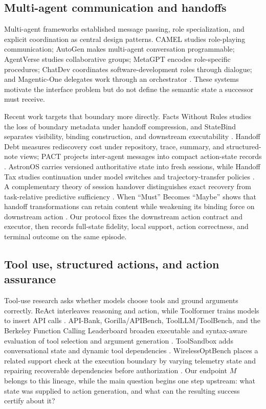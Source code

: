 \documentclass[11pt]{article}
\newcommand{\Maction}{M}
\begin{document}
\subsection{Multi-agent communication and handoffs}

Multi-agent frameworks established message passing, role specialization, and explicit coordination as central design patterns. CAMEL studies role-playing communication; AutoGen makes multi-agent conversation programmable; AgentVerse studies collaborative groups; MetaGPT encodes role-specific procedures; ChatDev coordinates software-development roles through dialogue; and Magentic-One delegates work through an orchestrator \citep{li2023camel,wu2024autogen,chen2024agentverse,hong2024metagpt,qian2024chatdev,fourney2024magenticone}. These systems motivate the interface problem but do not define the semantic state a successor must receive.

Recent work targets that boundary more directly. Facts Without Rules studies the loss of boundary metadata under handoff compression, and StateBind separates visibility, binding construction, and downstream executability \citep{wang2026facts,fu2026statebind}. Handoff Debt measures rediscovery cost under repository, trace, summary, and structured-note views; PACT projects inter-agent messages into compact action-state records \citep{kc2026handoffdebt,huang2026pact}. AstronOS carries versioned authoritative state into fresh sessions, while Handoff Tax studies continuation under model switches and trajectory-transfer policies \citep{nie2026astronos,ganz2026handofftax}. A complementary theory of session handover distinguishes exact recovery from task-relative predictive sufficiency \citep{kato2026handover}. When ``Must'' Becomes ``Maybe'' shows that handoff transformations can retain content while weakening its binding force on downstream action \citep{sun2026mustmaybe}. Our protocol fixes the downstream action contract and executor, then records full-state fidelity, local support, action correctness, and terminal outcome on the same episode.

\subsection{Tool use, structured actions, and action assurance}

Tool-use research asks whether models choose tools and ground arguments correctly. ReAct interleaves reasoning and action, while Toolformer trains models to insert API calls \citep{yao2023react,schick2023toolformer}. API-Bank, Gorilla/APIBench, ToolLLM/ToolBench, and the Berkeley Function Calling Leaderboard broaden executable and syntax-aware evaluation of tool selection and argument generation \citep{li2023apibank,patil2024gorilla,qin2024toolllm,patil2025bfcl}. ToolSandbox adds conversational state and dynamic tool dependencies \citep{lu2024toolsandbox}. WirelessOptBench places a related support check at the execution boundary by varying telemetry state and repairing recoverable dependencies before authorization \citep{lu2026wirelessops}. Our endpoint \(\Maction\) belongs to this lineage, while the main question begins one step upstream: what state was supplied to action generation, and what can the resulting success certify about it?
\end{document}
